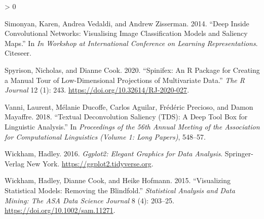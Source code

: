\documentclass[
  article]{article}
\newlength{\cslhangindent}
\newenvironment{CSLReferences}[2] %
 {%
  \setlength{\parindent}{0pt}
  \ifodd #1 \everypar{\setlength{\hangindent}{\cslhangindent}}\ignorespaces\fi
  \ifnum #2 > 0
  \setlength{\parskip}{#2\baselineskip}
  \fi
 }%
 {}
\begin{document}
\begin{CSLReferences}{1}{0}
\leavevmode\hypertarget{ref-simonyan_deep_2014}{}%
Simonyan, Karen, Andrea Vedaldi, and Andrew Zisserman. 2014. {``Deep Inside Convolutional Networks: {Visualising} Image Classification Models and Saliency Maps.''} In \emph{In {Workshop} at {International} {Conference} on {Learning} {Representations}}. Citeseer.

\leavevmode\hypertarget{ref-spyrison_spinifex_2020}{}%
Spyrison, Nicholas, and Dianne Cook. 2020. {``Spinifex: An {R} {Package} for {Creating} a {Manual} {Tour} of {Low}-Dimensional {Projections} of {Multivariate} {Data}.''} \emph{The R Journal} 12 (1): 243. \url{https://doi.org/10.32614/RJ-2020-027}.

\leavevmode\hypertarget{ref-vanni_textual_2018}{}%
Vanni, Laurent, Mélanie Ducoffe, Carlos Aguilar, Frédéric Precioso, and Damon Mayaffre. 2018. {``Textual {Deconvolution} {Saliency} ({TDS}): A Deep Tool Box for Linguistic Analysis.''} In \emph{Proceedings of the 56th {Annual} {Meeting} of the {Association} for {Computational} {Linguistics} ({Volume} 1: {Long} {Papers})}, 548--57.

\leavevmode\hypertarget{ref-wickham_ggplot2_2016}{}%
Wickham, Hadley. 2016. \emph{Ggplot2: {Elegant} {Graphics} for {Data} {Analysis}}. Springer-Verlag New York. \url{https://ggplot2.tidyverse.org}.

\leavevmode\hypertarget{ref-wickham_visualizing_2015}{}%
Wickham, Hadley, Dianne Cook, and Heike Hofmann. 2015. {``Visualizing Statistical Models: {Removing} the Blindfold.''} \emph{Statistical Analysis and Data Mining: The ASA Data Science Journal} 8 (4): 203--25. \url{https://doi.org/10.1002/sam.11271}.

\end{CSLReferences}
\end{document}
